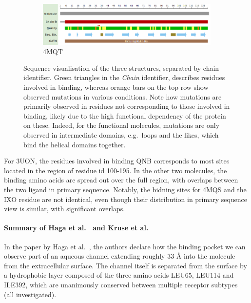 \documentclass[10pt]{article}\usepackage[]{graphicx}\usepackage[]{color}
\theoremstyle{plain}
\begin{document}
\begin{multicols*}{2}
\begin{figure}[p]
    \begin{subfigure}[H]{\textwidth}
      \includegraphics[width=.9\textwidth]{../figures/4mqt_macro_nano}
      \caption{4MQT}
    \end{subfigure}%
    \caption{Sequence visualisation of the three structures, separated by chain identifier. Green triangles in the \textit{Chain} identifier, describes residues involved in binding, whereas orange bars on the top row show observed mutations in various conditions. Note how mutations are primarily observed in residues not corresponding to those involved in binding, likely due to the high functional dependency of the protein on these. Indeed, for the functional molecules, mutations are only observed in intermediate domains, e.g.\ loops and the likes, which bind the helical domains together.}
  \end{figure}
  
  For 3UON, the residues involved in binding QNB corresponds to most sites located in the region of residue id 100-195. In the other two molecules, the binding amino acids are spread out over the full region, with overlaps between the two ligand in primary sequence. Notably, the bidning sites for 4MQS and the IXO residue are not identical, even though their distribution in primary sequence view is similar, with significant overlaps. 
\paragraph*{Summary of Haga et al.~\cite{Haga2012} and Kruse et al.~\cite{Kruse2013}\\}
  In the paper by Haga et al.~\cite{Haga2012}, the authors declare how the binding pocket we can observe part of an aqueous channel extending roughly 33 Å into the molecule from the extracellular surface. The channel itself is separated from the surface by a hydrophobic layer composed of the three amino acids LEU65, LEU114 and ILE392, which are unanimously conserved between multiple receptor subtypes (all investigated).
  

\end{multicols*}
\end{document}
